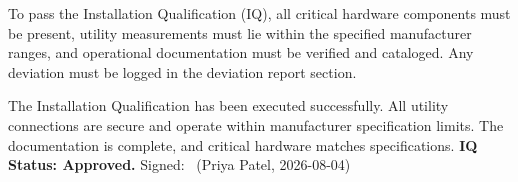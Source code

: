 \begin{acceptancebox}
To pass the Installation Qualification (IQ), all critical hardware components must be present, utility measurements must lie within the specified manufacturer ranges, and operational documentation must be verified and cataloged. Any deviation must be logged in the deviation report section.
\end{acceptancebox}

\begin{verdictbox}
The Installation Qualification has been executed successfully. All utility connections are secure and operate within manufacturer specification limits. The documentation is complete, and critical hardware matches specifications.
\textbf{IQ Status: Approved.} Signed: \makebox[3.0cm]{\hrulefill}\ (Priya Patel, 2026-08-04)
\end{verdictbox}
